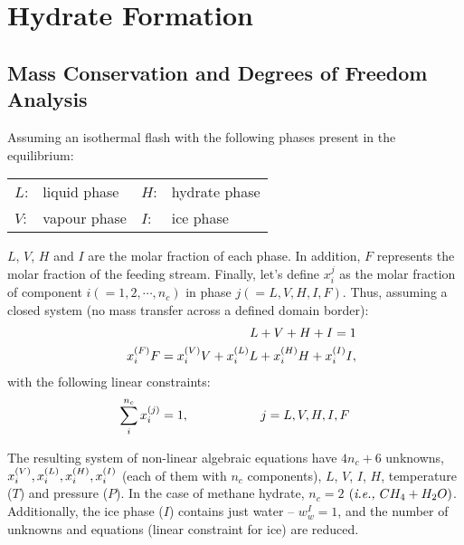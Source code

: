 
\chapter{Hydrate Formation}\label{Chapter:Hydrate}


\section{Mass Conservation and Degrees of Freedom Analysis}\label{Chapter:Hydrate:Section:MassConservation}

Assuming an isothermal flash with the following phases present in the equilibrium:
  \begin{center}
    \begin{tabular}{l l l l}
      $L$: & liquid phase & $H$: & hydrate phase \\
      $V$: & vapour phase & $I$: & ice phase \\ 
    \end{tabular}
  \end{center}
$L$, $V$, $H$ and $I$ are the molar fraction of each phase. In addition, $F$ represents the molar fraction of the feeding stream. Finally, let's define $x_{i}^{j}$ as the molar fraction of component $i \left(=1,2,\cdots,n_{c}\right)$ in phase $j \left(=L,V,H,I,F\right)$. Thus, assuming a closed system (\ie no mass transfer across a defined domain border):
  \begin{eqnarray}
     && L + V + H + I = 1 \\\label{Chapter:Hydrate:Eqn:Balance:MassFractionPhase}
     && \mfr[x]{i}{F}F = \mfr[x]{i}{V}V + \mfr[x]{i}{L}L + \mfr[x]{i}{H}H + \mfr[x]{i}{I}I, \label{Chapter:Hydrate:Eqn:Balance:MassFractionComponent}
  \end{eqnarray}
with the following linear constraints:
  \begin{equation}
    \summation_{i}^{n_{c}} \mfr[x]{i}{j} = 1, \hspace{2cm} j=L,V,H,I,F\label{Chapter:Hydrate:Eqn:Balance:MassFractionConstraint}
  \end{equation}
 
The resulting system of non-linear algebraic equations have $4n_{c}+6$ unknowns, \ie $\mfr[x]{i}{V}, \mfr[x]{i}{L}, \mfr[x]{i}{H}, \mfr[x]{i}{I}$ (each of them with $n_{c}$ components), $L$, $V$, $I$, $H$, temperature ($T$) and pressure ($P$).  In the case of methane hydrate, $n_{c}=2$ $\left(\text{\ie} CH_{4}+H_{2}O\right)$. Additionally, the ice phase ($I$) contains just water -- $w_{w}^{I}=1$, and the number of unknowns and equations (linear constraint for ice) are reduced.


